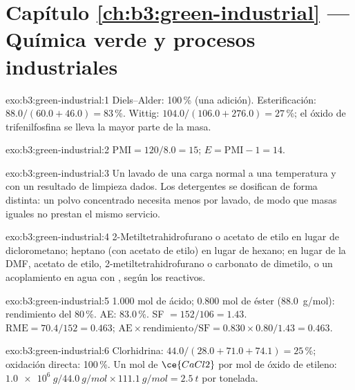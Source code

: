 \section*{Capítulo \ref{ch:b3:green-industrial} --- Química verde y procesos industriales}

\begin{solution}{exo:b3:green-industrial:1}
Diels--Alder: 100\,\% (una adición). Esterificación: $88.0/(60.0 + 46.0) = 83$\,\%. Wittig:
$104.0/(106.0 + 276.0) = 27$\,\%; el óxido de trifenilfosfina se lleva la mayor parte de la masa.
\end{solution}

\begin{solution}{exo:b3:green-industrial:2}
$\mathrm{PMI} = 120/8.0 = 15$; $E = \mathrm{PMI} - 1 = 14$.
\end{solution}

\begin{solution}{exo:b3:green-industrial:3}
Un lavado de una carga normal a una temperatura y con un resultado de limpieza dados. Los detergentes
se dosifican de forma distinta: un polvo concentrado necesita menos por lavado, de modo que masas iguales
no prestan el mismo servicio.
\end{solution}

\begin{solution}{exo:b3:green-industrial:4}
2-Metiltetrahidrofurano o acetato de etilo en lugar de diclorometano; heptano (con acetato
de etilo) en lugar de hexano; en lugar de la DMF, acetato de etilo, 2-metiltetrahidrofurano o
carbonato de dimetilo, o un acoplamiento en agua con , según los
reactivos.
\end{solution}

\begin{solution}{exo:b3:green-industrial:5}
1.000 mol de ácido; 0.800 mol de éster (\qty{88.0}{g/mol}): rendimiento del 80\,\%. AE: 83.0\,\%. SF $= 152/106 = 1.43$.
$\mathrm{RME} = 70.4/152 = 0.463$; $\mathrm{AE} \times \text{rendimiento}/\mathrm{SF} = 0.830 \times 0.80/1.43 = 0.463$.
\end{solution}

\begin{solution}{exo:b3:green-industrial:6}
Clorhidrina: $44.0/(28.0 + 71.0 + 74.1) = 25$\,\%; oxidación directa: 100\,\%. Un mol de $\ce{CaCl2}$ por mol de
óxido de etileno: $\qty{1.0e6}{g}/\qty{44.0}{g/mol} \times \qty{111.1}{g/mol} = \qty{2.5}{t}$ por tonelada.
\end{solution}

